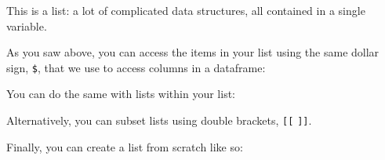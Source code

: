 \documentclass[
]{book}
\newenvironment{Shaded}{\begin{snugshade}}{\end{snugshade}}
\newcommand{\DecValTok}[1]{\textcolor[rgb]{0.00,0.00,0.81}{#1}}
\newcommand{\NormalTok}[1]{#1}
\newcommand{\SpecialCharTok}[1]{\textcolor[rgb]{0.00,0.00,0.00}{#1}}
\begin{document}
This is a list: a lot of complicated data structures, all contained in a single variable.

As you saw above, you can access the items in your list using the same dollar sign, \texttt{\$}, that we use to access columns in a dataframe:

\begin{Shaded}
\end{Shaded}

You can do the same with lists within your list:

\begin{Shaded}
\end{Shaded}

Alternatively, you can subset lists using double brackets, \texttt{{[}{[}} \texttt{{]}{]}}.

\begin{Shaded}
\end{Shaded}

Finally, you can create a list from scratch like so:
\end{document}
